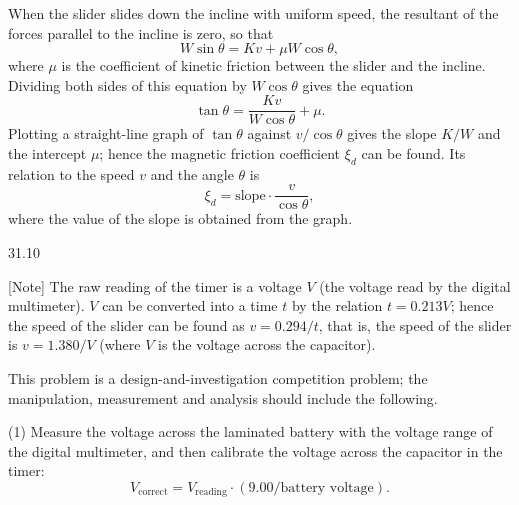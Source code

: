 When the slider slides down the incline with uniform speed, the resultant of the forces parallel to the incline is zero, so that
\begin{equation*}
W\sin\theta=Kv+\mu W\cos\theta ,
\end{equation*}
where $\mu$ is the coefficient of kinetic friction between the slider and the incline. Dividing both sides of this equation by $W\cos\theta$ gives the equation
\begin{equation*}
\tan\theta=\frac{Kv}{W\cos\theta}+\mu .
\end{equation*}
Plotting a straight-line graph of $\tan\theta$ against $v/\cos\theta$ gives the slope $K/W$ and the intercept $\mu$; hence the magnetic friction coefficient $\xi_d$ can be found. Its relation to the speed $v$ and the angle $\theta$ is
\begin{equation*}
\xi_d=\text{slope}\cdot\frac{v}{\cos\theta} ,
\end{equation*}
where the value of the slope is obtained from the graph.

\begin{figbox}{31.10}
\end{figbox}

[Note] The raw reading of the timer is a voltage $V$ (the voltage read by the digital multimeter). $V$ can be converted into a time $t$ by the relation $t=0.213V$; hence the speed of the slider can be found as $v=0.294/t$, that is, the speed of the slider is $v=1.380/V$ (where $V$ is the voltage across the capacitor).

This problem is a design-and-investigation competition problem; the manipulation, measurement and analysis should include the following.

(1) Measure the voltage across the laminated battery with the voltage range of the digital multimeter, and then calibrate the voltage across the capacitor in the timer:
\begin{equation*}
V_{\text{correct}}=V_{\text{reading}}\cdot(9.00/\text{battery voltage}).
\end{equation*}

